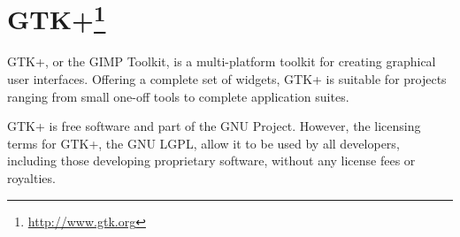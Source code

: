 
\section[GTK+]{GTK+\footnote{\url{http://www.gtk.org}}}\label{sec:Gtk}


GTK+, or the GIMP Toolkit, is a multi-platform toolkit for creating graphical user interfaces. Offering a complete set of widgets, GTK+ is suitable for projects ranging from small one-off tools to complete application suites.

GTK+ is free software and part of the GNU Project. However, the licensing terms for GTK+, the GNU LGPL, allow it to be used by all developers, including those developing proprietary software, without any license fees or royalties.

